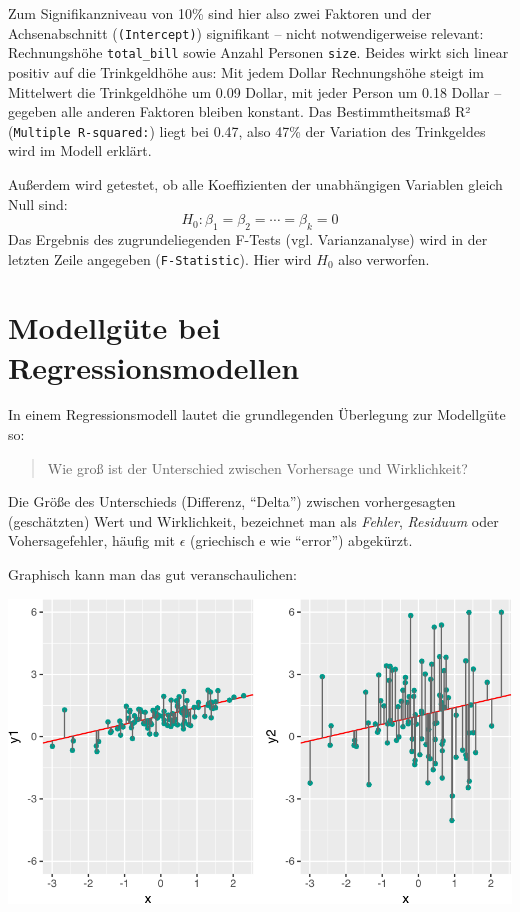\documentclass[12pt,]{book}
\begin{document}
Zum Signifikanzniveau von 10\% sind hier also zwei Faktoren und der
Achsenabschnitt (\texttt{(Intercept)}) signifikant -- nicht
notwendigerweise relevant: Rechnungshöhe \texttt{total\_bill} sowie
Anzahl Personen \texttt{size}. Beides wirkt sich linear positiv auf die
Trinkgeldhöhe aus: Mit jedem Dollar Rechnungshöhe steigt im Mittelwert
die Trinkgeldhöhe um 0.09 Dollar, mit jeder Person um 0.18 Dollar --
gegeben alle anderen Faktoren bleiben konstant. Das Bestimmtheitsmaß R²
(\texttt{Multiple\ R-squared:}) liegt bei 0.47, also 47\% der Variation
des Trinkgeldes wird im Modell erklärt.

Außerdem wird getestet, ob alle Koeffizienten der unabhängigen Variablen
gleich Null sind: \[H_0: \beta_1=\beta_2=\cdots=\beta_k=0\] Das Ergebnis
des zugrundeliegenden F-Tests (vgl. Varianzanalyse) wird in der letzten
Zeile angegeben (\texttt{F-Statistic}). Hier wird \(H_0\) also
verworfen.

\section{Modellgüte bei
Regressionsmodellen}\label{modellgute-bei-regressionsmodellen}

In einem Regressionsmodell lautet die grundlegenden Überlegung zur
Modellgüte so:

\begin{quote}
Wie groß ist der Unterschied zwischen Vorhersage und Wirklichkeit?
\end{quote}

Die Größe des Unterschieds (Differenz, ``Delta'') zwischen
vorhergesagten (geschätzten) Wert und Wirklichkeit, bezeichnet man als
\emph{Fehler}, \emph{Residuum} oder Vohersagefehler, häufig mit
\(\epsilon\) (griechisch e wie ``error'') abgekürzt.

Graphisch kann man das gut veranschaulichen:

\begin{center}\includegraphics[width=0.7\linewidth]{071_Regression_files/figure-latex/resids-plot-1} \end{center}
\end{document}
